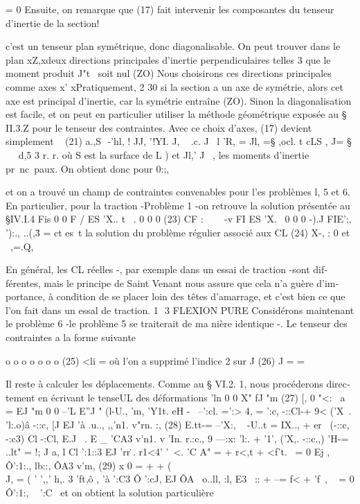 {= 0 
Ensuite, on remarque que (17) fait intervenir les composantes du tenseur d'inertie de la section! 


c'est un tenseur plan symétrique, donc diagonalisable. On peut trouver dans le plan xZ,xdeux directions principales d'inertie perpendiculaires telles
3 que le moment produit J"t~ soit nul 
(ZO) 
Nous choisirons ces directions principales comme axes x' xPratiquement,
2 30 
si la section a un axe de symétrie, alors cet axe est principal d'inertie, 
car la symétrie entraîne (ZO). Sinon la diagonalisation est facile, et on peut en particulier utiliser la méthode géométrique exposée au § II.3.Z pour 
le tenseur des contraintes. 
Avec ce choix d'axes, (17) devient simplement 
~
(21) a.,S  -'hl, ! JJ, '!YI. J, ~ .c. J~
l 
'R, = 
Jl, =§ ,ocl. t cLS , J= § ~~ d,5
3 
r. r. 
où S est la surface de L ) et Jl,' J~ , les moments d'inertie pr~nc~paux. 
On obtient donc pour 0:;, 

et on a trouvé un champ de contraintes convenables pour l'es problèmes l, 5 et 6. 
En particulier, pour la traction -Problème 1 -on retrouve la solution 
présentée au §IV.I.4 
Fis 0 0 
F / ES 'X..
t~ .
0 0 0
(23) CF : 
~~~ -v FI ES 'X.~ 0 0 0 
-).J FIE';, '):.,
..(,\.3 = 
ct es~t la solution du problème régulier associé aux CL 
(24) X-, : 0 et ~,=.Q, 

En général, les CL réelles -, par exemple dans un essai de traction -sont dif­
férentes, mais le principe de Saint Venant nous assure que cela n'a guère d'im­portance, à condition de se placer loin des têtes d'amarrage, et c'est bien ce que l'on fait dans un essal de traction. 
1  3 FLEXION PURE 
Considérons maintenant le problème 6 -le problème 5 se traiterait de ma­
nière identique -. Le tenseur des contraintes a la forme suivante 

o o 
o o o o o 
(25) <li = 
où l'on a supprimé l'indice 2 sur J 
(26) J = 
= 

Il reste à calculer les déplacements. Comme au § VI.2. 1, nous procéderons direc­tement en écrivant le tenseUL des déformations 
'ln 
0 0
X"
fJ "m
(27) [, 
0 "<:~ a
= 
EJ "m
0 0 --'L E''J " 
(l-U., 'm, 
'Y1t. 
eH -~ --':cl. =':> 4, = ':c, -::Cl-+ 9< ('X~. 'l:.o)â -::c, [J EJ 
'à .u.., ,,'n1. v"rn. :,
(28) 
E.tt-= --'X:, ~ -U..t = IX.., + er~ (-::c,  -:c3) Cl -:Cl, E.J ~. 
E _ 'CA3 v'n1. v 'In. 
r.:c., 9 ---:x: 'l:. + '1', ('X,. -::c.,)
'H-= ..lt" = 
!; J a, l
Cl ':1::3 EJ 'rr\..
r1<4' '~<. 'C A" = + r<,t + <f't.~ = 0
Ej ,
Ô':1:., lb::, 
ÔA3 v'm,
(29) x 0
= + + (\\ J, =
( ' ',,' h,. 3 'ft,ô ,
'à ':C3 Ô ':cJ, EJ 
ÔA~ o..ll,
:l, E3~ :: + --= f< + 'f~, ~ = 0 Ô':1:, ~ ':C~ 
et on obtient la solution particulière 

}
